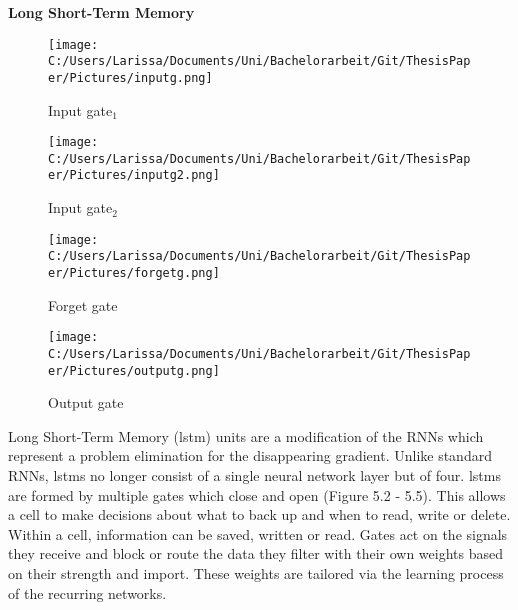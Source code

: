 \documentclass[a4paper, 11pt,titlepage,oneside,openany]{book}
\begin{document}
\noindent \textbf{Long Short-Term Memory} \\
\begin{figure}[h]
	\begin{minipage}[b]{0.4\linewidth}
		\texttt{[image: C:/Users/Larissa/Documents/Uni/Bachelorarbeit/Git/ThesisPaper/Pictures/inputg.png]}
		\caption{Input gate$_1$ \cite{rnn}}
	\end{minipage}
	\hfill
	\begin{minipage}[b]{0.4\linewidth}
		\texttt{[image: C:/Users/Larissa/Documents/Uni/Bachelorarbeit/Git/ThesisPaper/Pictures/inputg2.png]}
		\caption{Input gate$_2$ \cite{rnn}}
	\end{minipage}
	\begin{minipage}[b]{0.4\linewidth}
		\texttt{[image: C:/Users/Larissa/Documents/Uni/Bachelorarbeit/Git/ThesisPaper/Pictures/forgetg.png]}
		\caption{Forget gate \cite{rnn}}
	\end{minipage}
	\hfill
	\begin{minipage}[b]{0.4\linewidth}
		\texttt{[image: C:/Users/Larissa/Documents/Uni/Bachelorarbeit/Git/ThesisPaper/Pictures/outputg.png]}
		\caption{Output gate \cite{rnn}}
	\end{minipage}
\end{figure}
\indent Long Short-Term Memory (\gls{lstm}) units \cite{lstm} are a modification of the RNNs which represent a problem elimination for the disappearing gradient. Unlike standard RNNs, \gls{lstm}s no longer consist of a single neural network layer but of four. \gls{lstm}s are formed by multiple gates which close and open (Figure 5.2 - 5.5). This allows a cell to make decisions about what to back up and when to read, write or delete. Within a cell, information can be saved, written or read. Gates act on the signals they receive and block or route the data they filter with their own weights based on their strength and import. These weights are tailored via the learning process of the recurring networks. 
\end{document}
